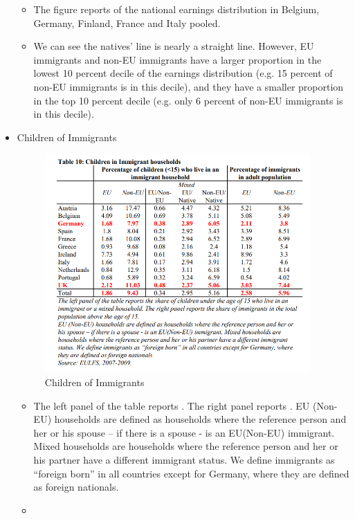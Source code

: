 \begin{itemize}
\begin{itemize}
    \item The figure reports  of the national earnings distribution in Belgium, Germany, Finland, France and Italy pooled.
    \item We can see the natives' line is nearly a straight line. However,  EU immigrants and non-EU immigrants have a larger proportion in the lowest 10 percent decile of the earnings distribution (e.g. 15 percent of non-EU immigrants is in this decile), and they have a smaller proportion in the top 10 percent decile (e.g. only 6 percent of non-EU immigrants is in this decile). 
    \end{itemize}

\item Children of Immigrants
\begin{figure}[H]
                \centering
                \includegraphics[width=4in]{images/ch11/10.png}
                \caption{Children of Immigrants}
            \end{figure}
            
\begin{itemize}
    \item The left panel of the table reports . The right panel reports . EU (Non-EU) households are defined as households where the reference person and her or his spouse – if there is a spouse - is an EU(Non-EU) immigrant. Mixed households are households where the reference person and her or his partner have a different immigrant status. We define immigrants as “foreign born” in all countries except for Germany, where they are defined as foreign nationals.
    \item 
    \end{itemize}


\end{itemize}
